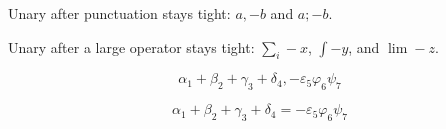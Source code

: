 Unary after punctuation stays tight: $a,-b$ and $a;-b$.

Unary after a large operator stays tight: $\sum_i-x$, $\int-y$, and $\lim-z$.

\[
  \alpha_{1}
  + \beta_{2}
  + \gamma_{3}
  + \delta_{4}, -\varepsilon_{5} \varphi_{6} \psi_{7}
\]

\[
  \alpha_{1} + \beta_{2} + \gamma_{3} + \delta_{4} = -\varepsilon_{5} \varphi_{6} \psi_{7}
\]
